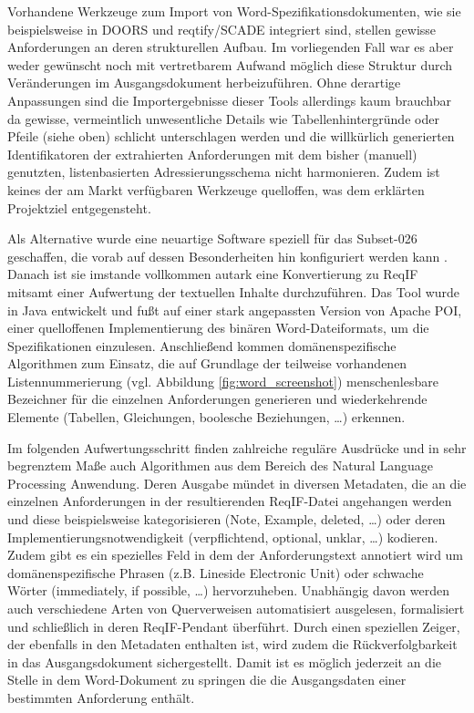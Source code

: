 \documentclass[twoside]{article}
\begin{document}
\begin{multicols}{2}
Vorhandene Werkzeuge zum Import von Word-Spezifikationsdokumenten, wie sie beispielsweise in DOORS und reqtify/SCADE integriert sind, stellen gewisse Anforderungen an deren strukturellen Aufbau. Im vorliegenden Fall war es aber weder gewünscht noch mit vertretbarem Aufwand möglich diese Struktur durch Veränderungen im Ausgangsdokument herbeizuführen. Ohne derartige Anpassungen sind die Importergebnisse dieser Tools allerdings kaum brauchbar da gewisse, vermeintlich unwesentliche Details wie Tabellenhintergründe oder Pfeile (siehe oben) schlicht unterschlagen werden und die willkürlich generierten Identifikatoren der extrahierten Anforderungen mit dem bisher (manuell) genutzten, listenbasierten Adressierungsschema nicht harmonieren. Zudem ist keines der am Markt verfügbaren Werkzeuge quelloffen, was dem erklärten Projektziel entgegensteht.

Als Alternative wurde eine neuartige Software speziell für das \glqq{}Subset-026\grqq{} geschaffen, die vorab auf dessen Besonderheiten hin konfiguriert werden kann \cite{TodoMoriz}. Danach ist sie imstande vollkommen autark eine Konvertierung zu ReqIF mitsamt einer Aufwertung der textuellen Inhalte durchzuführen. Das Tool wurde in Java entwickelt und fußt auf einer stark angepassten Version von Apache POI, einer quelloffenen Implementierung des binären Word-Dateiformats, um die Spezifikationen einzulesen. Anschließend kommen domänenspezifische Algorithmen zum Einsatz, die auf Grundlage der teilweise vorhandenen Listennummerierung (vgl. Abbildung \ref{fig:word_screenshot}) menschenlesbare Bezeichner für die einzelnen Anforderungen generieren und wiederkehrende Elemente (Tabellen, Gleichungen, boolesche Beziehungen, \ldots{}) erkennen.

Im folgenden Aufwertungsschritt finden zahlreiche reguläre Ausdrücke und in sehr begrenztem Maße auch Algorithmen aus dem Bereich des Natural Language Processing Anwendung. Deren Ausgabe mündet in diversen Metadaten, die an die einzelnen Anforderungen in der resultierenden ReqIF-Datei angehangen werden und diese beispielsweise kategorisieren (Note, Example, deleted, \ldots ) oder deren Implementierungsnotwendigkeit (verpflichtend, optional, unklar, \ldots ) kodieren. Zudem gibt es ein spezielles Feld in dem der Anforderungstext annotiert wird um domänenspezifische Phrasen (z.B. \glqq Lineside Electronic Unit\grqq ) oder schwache Wörter (\glqq{}immediately\grqq{}, \glqq{}if possible\grqq{}, \ldots{}) hervorzuheben. Unabhängig davon werden auch verschiedene Arten von Querverweisen automatisiert ausgelesen, formalisiert und schließlich in deren ReqIF-Pendant überführt. Durch einen speziellen Zeiger, der ebenfalls in den Metadaten enthalten ist, wird zudem die Rückverfolgbarkeit in das Ausgangsdokument sichergestellt. Damit ist es möglich jederzeit an die Stelle in dem Word-Dokument zu springen die die Ausgangsdaten einer bestimmten Anforderung enthält.


\end{multicols}
\end{document}
